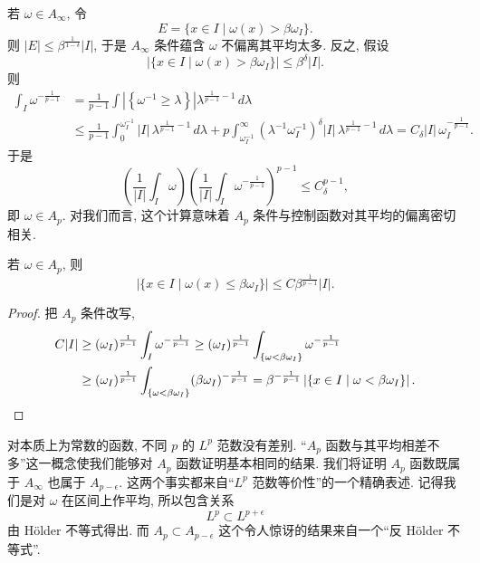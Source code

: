 \begin{remark}\label{rem:3.4}
若 $\omega\in A_\infty$, 令
\[
E=\{x\in I \mid \omega(x)>\beta\omega_{I}\}.
\]
则 $|E|\leq\beta^{\frac{1}{1-\delta}}|I|$, 于是 $A_\infty$ 条件蕴含 $\omega$ 不偏离其平均太多. 反之, 假设
\[
|\{x\in I \mid \omega(x)>\beta\omega_{I}\}|\leq\beta^{\delta}|I|.
\]
则
\begin{align*}
\int_{I}\omega^{-\frac{1}{p-1}}
&=\frac{1}{p-1}\int\left|\left\{\omega^{-1}\geq\lambda\right\}\right|\lambda^{\frac{1}{p-1}-1}\,d\lambda \\
&\leq\frac{1}{p-1}\int_{0}^{\omega_{I}^{-1}}|I|\,\lambda^{\frac{1}{p-1}-1}\,d\lambda
+p\int_{\omega_{I}^{-1}}^{\infty}\left(\lambda^{-1}\omega_{I}^{-1}\right)^{\delta}|I|\,\lambda^{\frac{1}{p-1}-1}\,d\lambda
=C_{\delta}|I|\,\omega_{I}^{-\frac{1}{p-1}}.
\end{align*}
于是
\[
\left(\frac{1}{|I|}\int_{I}\omega\right)\left(\frac{1}{|I|}\int_{I}\omega^{-\frac{1}{p-1}}\right)^{p-1}\leq C_{\delta}^{p-1},
\]
即 $\omega\in A_p$. 对我们而言, 这个计算意味着 $A_p$ 条件与控制函数对其平均的偏离密切相关.
\end{remark}

\begin{lemma}\label{lem:3.5}
若 $\omega\in A_p$, 则
\[
|\{x\in I \mid \omega(x)\leq\beta\omega_{I}\}|\leq C\beta^{\frac{1}{p-1}}|I|.
\]
\end{lemma}

\begin{proof}
把 $A_{p}$ 条件改写,
\begin{align*}
C|I|&\geq(\omega_{I})^{\frac{1}{p-1}}\int_{I}\omega^{-\frac{1}{p-1}}
\geq(\omega_{I})^{\frac{1}{p-1}}\int_{\{\omega<\beta\omega_{I}\}}\omega^{-\frac{1}{p-1}} \\
&\geq(\omega_{I})^{\frac{1}{p-1}}\int_{\{\omega<\beta\omega_{I}\}}(\beta\omega_{I})^{-\frac{1}{p-1}}
=\beta^{-\frac{1}{p-1}}\left|\left\{x\in I \mid \omega<\beta\omega_{I}\right\}\right|. \qedhere
\end{align*}
\end{proof}

\begin{remark}\label{rem:3.6}
对本质上为常数的函数, 不同 $p$ 的 $L^p$ 范数没有差别. ``$A_p$ 函数与其平均相差不多''这一概念使我们能够对 $A_p$ 函数证明基本相同的结果. 我们将证明 $A_p$ 函数既属于 $A_\infty$ 也属于 $A_{p-\epsilon}$. 这两个事实都来自``$L^p$ 范数等价性''的一个精确表述. 记得我们是对 $\omega$ 在区间上作平均, 所以包含关系
\[
L^{p}\subset L^{p+\epsilon}
\]
由 H\"older 不等式得出. 而 $A_p\subset A_{p-\epsilon}$ 这个令人惊讶的结果来自一个``反 H\"older 不等式''.
\end{remark}

